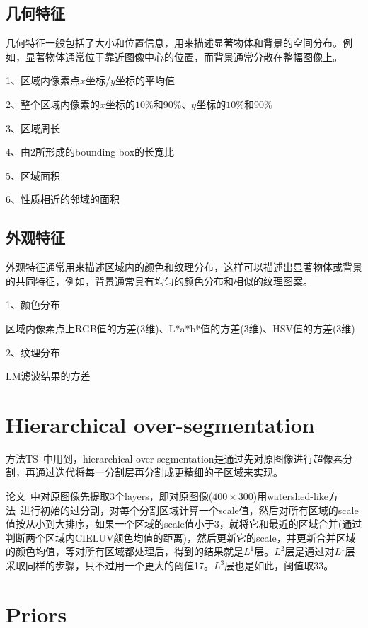 \documentclass[12pt]{article}
\begin{document}
\subsection{几何特征}

几何特征一般包括了大小和位置信息，用来描述显著物体和背景的空间分布。例如，显著物体通常位于靠近图像中心的位置，而背景通常分散在整幅图像上。

1、区域内像素点$x$坐标/$y$坐标的平均值

2、整个区域内像素的$x$坐标的$10\%$和$90\%$、$y$坐标的$10\%$和$90\%$

 3、区域周长
 
 4、由2所形成的bounding box的长宽比
 
 5、区域面积
 
 6、性质相近的邻域的面积
 
 \subsection{外观特征}
 
 外观特征通常用来描述区域内的颜色和纹理分布，这样可以描述出显著物体或背景的共同特征，例如，背景通常具有均匀的颜色分布和相似的纹理图案。

1、颜色分布

区域内像素点上RGB值的方差(3维)、L*a*b*值的方差(3维)、HSV值的方差(3维)

2、纹理分布

LM滤波结果的方差

\section{Hierarchical over-segmentation}

方法TS~\cite{zhu2014tag}中用到，hierarchical over-segmentation是通过先对原图像进行超像素分割，再通过迭代将每一分割层再分割成更精细的子区域来实现。

论文~\cite{yan2013hierarchical}中对原图像先提取3个layers，即对原图像($400 \times 300$)用watershed-like方法~\cite{gonzalez2009digital}进行初始的过分割，对每个分割区域计算一个scale值，然后对所有区域的scale值按从小到大排序，如果一个区域的scale值小于3，就将它和最近的区域合并(通过判断两个区域内CIELUV颜色均值的距离)，然后更新它的scale，并更新合并区域的颜色均值，等对所有区域都处理后，得到的结果就是$L^1$层。$L^2$层是通过对$L^1$层采取同样的步骤，只不过用一个更大的阈值17。$L^3$层也是如此，阈值取33。

\section{Priors}
\end{document}
